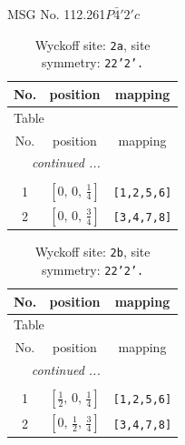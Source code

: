 \documentclass[fleqn,8pt]{jsarticle}
\begin{document}
\setcounter{MaxMatrixCols}{32}

\renewcommand{\tablename}{Table~}
\renewcommand{\figurename}{Figure~}
\begin{center}
\LARGE
MSG No. 112.261\quad$P\bar{4}'2'c$
\end{center}
\renewcommand{\arraystretch}{1.2}
\begin{longtable}{ccc}
\caption{Wyckoff site: {\tt 2a}, site symmetry: {\tt 22'2'.}}
 \\
 \hline \hline
No. & position & mapping \\ \hline \endfirsthead

\multicolumn{2}{l}{\tablename\ \thetable{}} \\
 \hline \hline
No. & position & mapping \\ \hline \endhead

 \hline \hline
\multicolumn{2}{r}{\footnotesize\it continued ...} \\ \endfoot

 \hline \hline
\multicolumn{2}{r}{} \\ \endlastfoot

1 & $\left[ 0,\, 0,\, \frac{1}{4} \right]$ & {\tt [1,2,5,6]} \\ \hline
2 & $\left[ 0,\, 0,\, \frac{3}{4} \right]$ & {\tt [3,4,7,8]} \\
\end{longtable}
\renewcommand{\arraystretch}{1.2}
\begin{longtable}{ccc}
\caption{Wyckoff site: {\tt 2b}, site symmetry: {\tt 22'2'.}}
 \\
 \hline \hline
No. & position & mapping \\ \hline \endfirsthead

\multicolumn{2}{l}{\tablename\ \thetable{}} \\
 \hline \hline
No. & position & mapping \\ \hline \endhead

 \hline \hline
\multicolumn{2}{r}{\footnotesize\it continued ...} \\ \endfoot

 \hline \hline
\multicolumn{2}{r}{} \\ \endlastfoot

1 & $\left[ \frac{1}{2},\, 0,\, \frac{1}{4} \right]$ & {\tt [1,2,5,6]} \\ \hline
2 & $\left[ 0,\, \frac{1}{2},\, \frac{3}{4} \right]$ & {\tt [3,4,7,8]} \\
\end{longtable}
\end{document}
